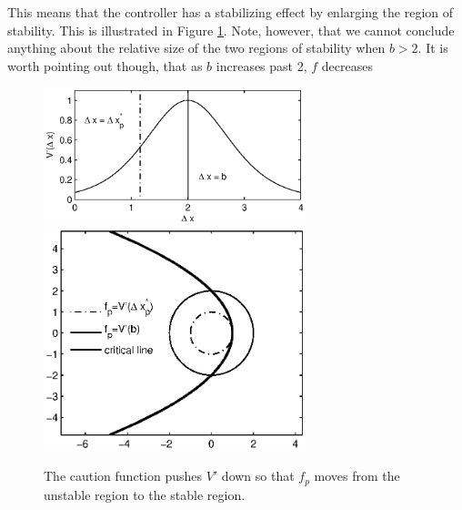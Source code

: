 \documentclass[10pt,twocolumn]{article}
\newcommand{\lm}{\fontfamily{\sfdefault}\selectfont}
\begin{document}
This means that the controller has a stabilizing effect by enlarging the region of stability. This is illustrated in Figure \ref{fig:ctrstbl}. Note, however, that we cannot conclude anything about the relative size of the two regions of stability when $b>2$. It is worth pointing out though, that as $b$ increases past 2, $f$ decreases


\begin{figure}[!h]
\lm
\begin{center}
\includegraphics[width=3in]{vopt_caution}
\includegraphics[width=3in]{ctrstbl}
\end{center}
\caption{ \label{fig:ctrstbl} The caution function pushes $V'$ down so that $f_p$ moves from the unstable region to the stable region.}
\end{figure}
\end{document}
